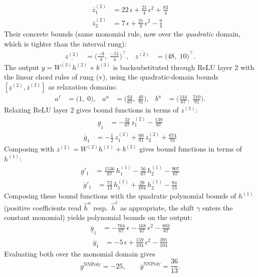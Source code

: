 \documentclass[11pt]{article}
\begin{document}
\begin{align*}
\overline{z}^{(2)}_{1} &= 22\,\epsilon + \frac{21}{4}\,\epsilon^2 + \frac{83}{4} \\
\overline{z}^{(2)}_{2} &= 7\,\epsilon + \frac{21}{4}\,\epsilon^2 - \frac{9}{4}
\end{align*}
Their concrete bounds (same monomial rule, now over the \emph{quadratic} domain, which is tighter than the interval rung):
\begin{align*}
\underline{z^{(2)}} &= \bigl(\frac{-9}{4},\; \frac{-51}{4}\bigr)^{\!\top}, & \overline{z^{(2)}} &= \bigl(48,\; 10\bigr)^{\!\top}.
\end{align*}
The output $y = W^{(3)} h^{(2)} + b^{(3)}$ is backsubstituted through ReLU layer 2 with the linear chord rules of rung (v), using the quadratic-domain bounds
$[\underline{z}^{(2)}, \overline{z}^{(2)}]$ as relaxation domains:
\begin{align*}
a^{\ell} &= \bigl(1,\; 0\bigr), & a^{u} &= \bigl(\frac{64}{67},\; \frac{40}{91}\bigr), & b^{u} &= \bigl(\frac{144}{67},\; \frac{510}{91}\bigr).
\end{align*}
Relaxing ReLU layer 2 gives bound functions in terms of $z^{(2)}$:
\begin{align*}
\underline{g}_{1} &= -\frac{32}{67}\,z^{(2)}_{1} - \frac{139}{67}
\end{align*}
\begin{align*}
\overline{g}_{1} &= -\frac{1}{2}\,z^{(2)}_{1} + \frac{60}{91}\,z^{(2)}_{2} + \frac{674}{91}
\end{align*}
Composing with $z^{(2)} = W^{(2)} h^{(1)} + b^{(2)}$ gives bound functions in terms of $h^{(1)}$:
\begin{align*}
\underline{g}'_{1} &= \frac{1536}{67}\,h^{(1)}_{1} - \frac{56}{67}\,h^{(1)}_{2} - \frac{907}{67}
\end{align*}
\begin{align*}
\overline{g}'_{1} &= \frac{72}{13}\,h^{(1)}_{1} + \frac{29}{104}\,h^{(1)}_{2} - \frac{94}{13}
\end{align*}
Composing these bound functions with the quadratic polynomial bounds of $h^{(1)}$ (positive
coefficients read $\hat{h}^{u}$ resp.\ $\hat{h}^{\ell}$ as appropriate, the shift $\gamma$ enters the
constant monomial) yields polynomial bounds on the output:
\begin{align*}
\underline{y}_{1} &= -\frac{704}{67}\,\epsilon - \frac{168}{67}\,\epsilon^2 - \frac{803}{67}
\end{align*}
\begin{align*}
\overline{y}_{1} &= -5\,\epsilon + \frac{159}{104}\,\epsilon^2 - \frac{391}{104}
\end{align*}
Evaluating both over the monomial domain gives
\begin{equation*}
\underline{y}^{\text{NNPoly}} = -25, \qquad \overline{y}^{\text{NNPoly}} = \frac{36}{13}.
\end{equation*}
\end{document}
